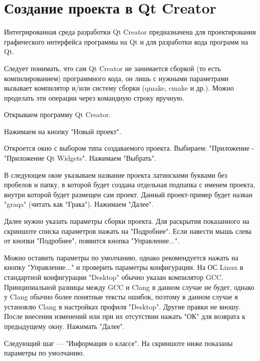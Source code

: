 \section{Создание проекта в Qt Creator}

Интегрированная среда разработки Qt Creator предназначена для проектирования графического интерфейса программы на Qt и для разработки кода программ на Qt.

Следует понимать, что сам Qt Creator не занимается сборкой (то есть компилированием) программного кода, он лишь с нужными параметрами вызывает компилятор и/или систему сборки (qmake, cmake и др.). Можно проделать эти операции через командную строку вручную.

Открываем программу Qt Creator.

Нажимаем на кнопку "Новый проект".

Откроется окно с выбором типа создаваемого проекта. Выбираем: "Приложение - "Приложение Qt Widgets". Нажимаем "Выбрать".

В следующем окне указываем название проекта латинскими буквами без пробелов и папку, в которой будет создана отдельная подпапка с именем проекта, внутри которой будет размещен сам проект. Данный проект-пример будет назван "graqa" (читать как "Грака"). Нажимаем "Далее".

Далее нужно указать параметры сборки проекта. Для раскрытия показанного на скриншоте списка параметров нажать на "Подробнее". Если навести мышь слева от кнопки "Подробнее", появится кнопка "Управление...".

Можно оставить параметры по умолчанию, однако рекомендуется нажать на кнопку "Управление..." и проверить параметры конфигурации. На ОС Linux в стандартной конфигурации "Desktop" обычно указан компилятор GCC. Принципиальной разницы между GCC и Clang в данном случае не будет, однако у Clang обычно более понятные тексты ошибок, поэтому в данном случае я установлю Clang в настройках профиля "Desktop". Другие правки не вношу. После внесения изменений или при их отсутствии нажать "ОК" для возврата к предыдущему окну. Нажимать "Далее".

Следующий шаг — "Информация о классе". На скриншоте ниже показаны параметры по умолчанию.

